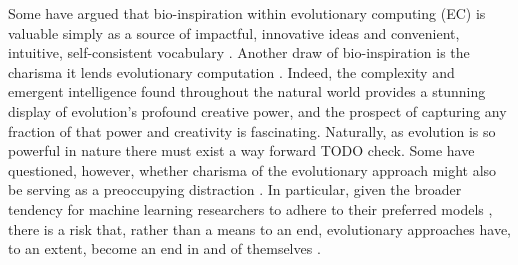 Some have argued that bio-inspiration within evolutionary computing (EC) is valuable simply as a source of impactful, innovative ideas and convenient, intuitive, self-consistent vocabulary \citep{sorensen2015metaheuristics,banzhaf2006artificial}.
Another draw of bio-inspiration is the charisma it lends evolutionary computation \citep{lehman2020surprising}.
Indeed, the complexity and emergent intelligence found throughout the natural world provides a stunning display of evolution’s profound creative power, and the prospect of capturing any fraction of that power and creativity is fascinating.
Naturally, as evolution is so powerful in nature there must exist a way forward \citep{miikkulainen2021biological} TODO check.
Some have questioned, however, whether charisma of the evolutionary approach might also be serving as a preoccupying distraction \citep{moore2023evolution,sorensen2015metaheuristics}.
In particular, given the broader tendency for machine learning researchers to adhere to their preferred models \citep{domingos2012few}, there is a risk that, rather than a means to an end, evolutionary approaches have, to an extent, become an end in and of themselves \citep{woodward2016gp,yampolskiy2018we}.


